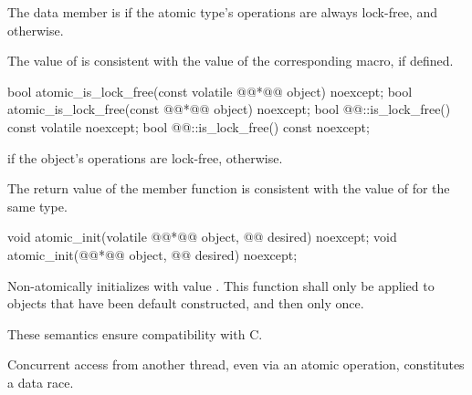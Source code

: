 \begin{itemdescr}
\pnum
The  data member  is 
if the atomic type's operations are always lock-free, and  otherwise.
\begin{note}
The value of  is consistent with the value of
the corresponding  macro, if defined.
\end{note}
\end{itemdescr}

%
%
%
%
\begin{itemdecl}
bool atomic_is_lock_free(const volatile @@*@\itcorr[-1]@ object) noexcept;
bool atomic_is_lock_free(const @@*@\itcorr[-1]@ object) noexcept;
bool @@::is_lock_free() const volatile noexcept;
bool @@::is_lock_free() const noexcept;
\end{itemdecl}

\begin{itemdescr}
\pnum
\returns {} if the object's operations are lock-free,  otherwise.
\begin{note}
The return value of the  member function
is consistent with the value of  for the same type.
\end{note}
\end{itemdescr}

%
\begin{itemdecl}
void atomic_init(volatile @@*@\itcorr[-1]@ object, @@ desired) noexcept;
void atomic_init(@@*@\itcorr[-1]@ object, @@ desired) noexcept;
\end{itemdecl}

\begin{itemdescr}
\pnum
\effects Non-atomically
initializes  with value . This function shall only be applied
to objects that have been default constructed, and then only once.
\begin{note}
These semantics ensure compatibility with C.
\end{note}
\begin{note}
Concurrent access from another thread, even via an atomic operation, constitutes
a data race.
\end{note}

\end{itemdescr}

